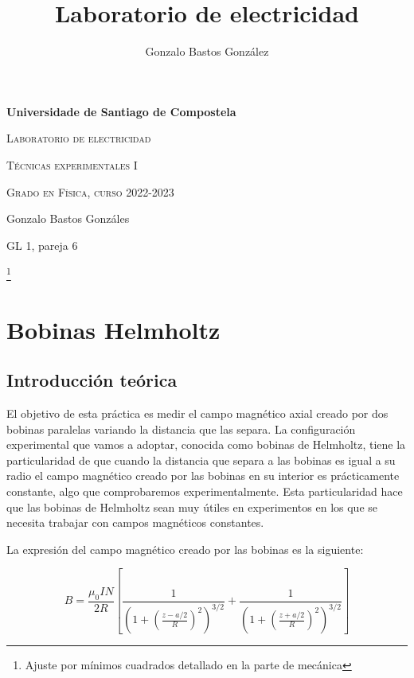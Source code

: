 \documentclass[a4paper,12pt,titlepage]{report}
\title{Laboratorio de electricidad}
\author{Gonzalo Bastos González}
\begin{document}
\begin{titlepage}
    \centering
    {\bfseries\LARGE Universidade de Santiago de Compostela \par}
    \vspace{3cm}
    {\scshape\Huge Laboratorio de electricidad \par}
    \vspace{3cm}
    {\scshape\Large Técnicas experimentales I \par}
    \vspace{1cm}
    {\scshape\Large Grado en Física, curso 2022-2023 \par}
    \vfill
    {\Large Gonzalo Bastos Gonzáles \par}
    {\Large GL 1, pareja 6 \par}
    \vspace{3cm}
    \end{titlepage}

\tableofcontents

\footnote{Ajuste por mínimos cuadrados detallado en la parte de mecánica}

\chapter{Bobinas Helmholtz}

\section{Introducción teórica}

El objetivo de esta práctica es medir el campo magnético axial creado por dos bobinas paralelas variando la distancia que las separa. La configuración experimental que vamos a adoptar, conocida como bobinas de Helmholtz, tiene la particularidad de que cuando la distancia que separa a las bobinas es igual a su radio el campo magnético creado por las bobinas en su interior es prácticamente constante, algo que comprobaremos experimentalmente. Esta particularidad hace que las bobinas de Helmholtz sean muy útiles en experimentos en los que se necesita trabajar con campos magnéticos constantes.

\par La expresión del campo magnético creado por las bobinas es la siguiente:

\begin{equation}
    B=\frac{\mu_0 I N}{2 R}\left[\frac{1}{\left(1+\left(\frac{z-a / 2}{R}\right)^2\right)^{3 / 2}}+\frac{1}{\left(1+\left(\frac{z+a / 2}{R}\right)^2\right)^{3 / 2}}\right]
    \label{Campo magnético}
\end{equation}
\end{document}
